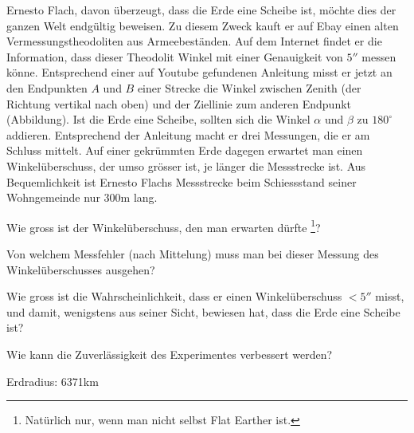 Ernesto Flach, davon überzeugt, dass die Erde eine Scheibe ist,
möchte dies der ganzen Welt endgültig beweisen.
Zu diesem Zweck kauft er auf Ebay einen alten Vermessungstheodoliten
aus Armeebeständen.
Auf dem Internet findet er die Information, dass dieser Theodolit Winkel
mit einer Genauigkeit von $5''$ messen könne.
Entsprechend einer auf Youtube gefundenen Anleitung misst er jetzt an
den Endpunkten $A$ und $B$ einer Strecke die Winkel zwischen Zenith
(der Richtung vertikal nach oben) und der Ziellinie zum anderen Endpunkt
(Abbildung).
Ist die Erde eine Scheibe, sollten sich die Winkel $\alpha$
und $\beta$ zu $180^\circ$
addieren.
Entsprechend der Anleitung macht er drei Messungen, die er am Schluss 
mittelt.
Auf einer gekrümmten Erde dagegen erwartet man einen Winkelüberschuss,
der umso grösser ist, je länger die Messstrecke ist.
Aus Bequemlichkeit ist Ernesto Flachs Messstrecke beim Schiessstand
seiner Wohngemeinde nur 300m lang.
\begin{center}
\end{center}

\begin{teilaufgaben}
\item
Wie gross ist der Winkelüberschuss, den man erwarten dürfte%
\footnote{Natürlich nur, wenn man nicht selbst Flat Earther ist.}?
\item
Von welchem Messfehler (nach Mittelung) muss man bei dieser Messung
des Winkelüberschusses ausgehen?
\item
Wie gross ist die Wahrscheinlichkeit, dass er einen Winkelüberschuss $<5''$
misst, und damit, wenigstens aus seiner Sicht, bewiesen hat, dass
die Erde eine Scheibe ist?
\item 
Wie kann die Zuverlässigkeit des Experimentes verbessert werden?
\end{teilaufgaben}


\begin{hinweis}
Erdradius: 6371km
\end{hinweis}

